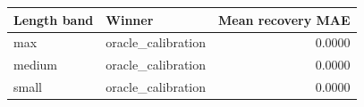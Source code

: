 \begin{tabular}{llr}
\toprule
Length band & Winner & Mean recovery MAE \\
\midrule
max & oracle\_calibration & 0.0000 \\
medium & oracle\_calibration & 0.0000 \\
small & oracle\_calibration & 0.0000 \\
\bottomrule
\end{tabular}
